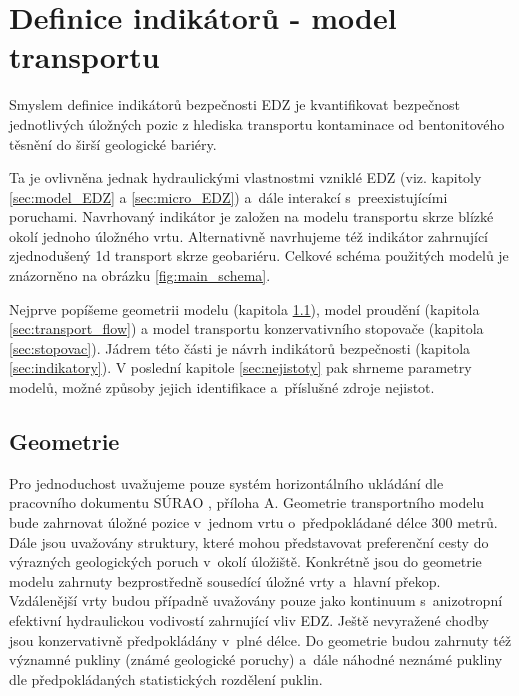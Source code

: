 \documentclass{article}
\begin{document}
\section{Definice indikátorů - model transportu}
\label{sec:transport}



Smyslem definice indikátorů bezpečnosti EDZ je kvantifikovat bezpečnost jednotlivých úložných pozic z hlediska 
transportu kontaminace od bentonitového těsnění do širší geologické bariéry. 

Ta je ovlivněna jednak hydraulickými vlastnostmi
vzniklé EDZ (viz. kapitoly \ref{sec:model_EDZ} a \ref{sec:micro_EDZ}) a~dále interakcí s~preexistujícími poruchami. 
Navrhovaný indikátor je založen na modelu transportu skrze blízké okolí jednoho úložného vrtu. Alternativně navrhujeme též indikátor zahrnující zjednodušený 1d transport skrze geobariéru.
Celkové schéma použitých modelů je znázorněno na obrázku \ref{fig:main_schema}.


Nejprve popíšeme geometrii modelu (kapitola  \ref{sec:transport_geometrie}), model proudění (kapitola \ref{sec:transport_flow})
a model transportu konzervativního stopovače (kapitola \ref{sec:stopovac}). Jádrem této části je návrh indikátorů bezpečnosti (kapitola \ref{sec:indikatory}). 
V poslední kapitole \ref{sec:nejistoty} pak shrneme parametry modelů, možné způsoby jejich identifikace a~příslušné zdroje nejistot.




\subsection{Geometrie}
\label{sec:transport_geometrie}
 Pro jednoduchost uvažujeme pouze systém horizontálního ukládání dle pracovního dokumentu SÚRAO , příloha A. 
 Geometrie transportního modelu bude zahrnovat úložné pozice v~jednom vrtu o~předpokládané délce 300 metrů. 
 Dále jsou uvažovány  struktury, které mohou představovat preferenční cesty do výrazných geologických poruch v~okolí úložiště. 
 Konkrétně jsou do geometrie modelu zahrnuty bezprostředně sousedící úložné vrty a~hlavní překop. Vzdálenější vrty budou případně 
 uvažovány pouze jako kontinuum s~anizotropní efektivní hydraulickou vodivostí zahrnující vliv EDZ. 
Ještě nevyražené chodby jsou konzervativně předpokládány v~plné délce. Do geometrie budou zahrnuty též významné pukliny 
(známé geologické poruchy) a~dále náhodné neznámé pukliny dle předpokládaných statistických rozdělení puklin.
\end{document}
